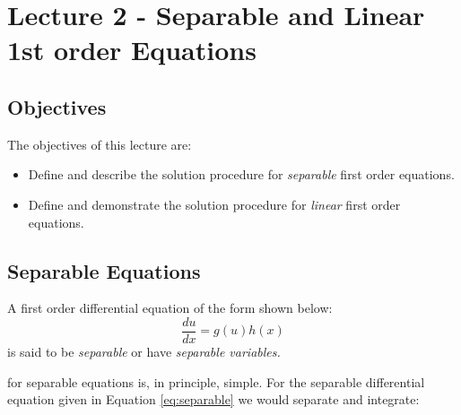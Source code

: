 \chapter{Lecture 2 - Separable and Linear 1st order Equations}
\label{ch:lec2}
\section{Objectives}
The objectives of this lecture are:
\begin{itemize}
\item Define and describe the solution procedure for \emph{separable} first order equations.
\item Define and demonstrate the solution procedure for \emph{linear} first order equations.
\end{itemize}

\section{Separable Equations}
A first order differential equation of the form shown below:
\begin{equation}
\frac{du}{dx} = g(u)h(x)
\label{eq:separable}
\end{equation}
is said to be \emph{separable} or have \emph{separable variables.} 

 for separable equations is, in principle, simple.  For the separable differential equation given in Equation \ref{eq:separable} we would separate and integrate:

